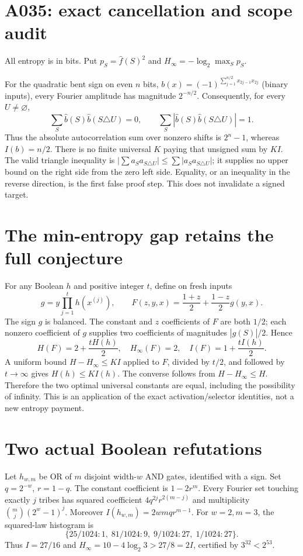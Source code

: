 \documentclass{article}
\begin{document}
\section*{A035: exact cancellation and scope audit}
All entropy is in bits. Put $p_S=\widehat f(S)^2$ and
$H_\infty=-\log_2\max_Sp_S$.

For the quadratic bent sign on even $n$ bits,
$b(x)=(-1)^{\sum_{j=1}^{n/2}x_{2j-1}x_{2j}}$ (binary inputs),
every Fourier amplitude has magnitude $2^{-n/2}$.
Consequently, for every $U\ne\varnothing$,
\[
 \sum_S\widehat b(S)\widehat b(S\triangle U)=0,
 \qquad\sum_S|\widehat b(S)\widehat b(S\triangle U)|=1.
\]
Thus the absolute autocorrelation sum over nonzero shifts is
$2^n-1$, whereas $I(b)=n/2$. There is no finite universal $K$
paying that unsigned sum by $K I$. The valid triangle inequality
is $|\sum a_Sa_{S\triangle U}|\le\sum|a_Sa_{S\triangle U}|$;
it supplies no upper bound on the right side from the zero left
side. Equality, or an inequality in the reverse direction, is the
first false proof step. This does not invalidate a signed target.

\section*{The min-entropy gap retains the full conjecture}
For any Boolean $h$ and positive integer $t$, define on fresh inputs
\[
 g=y\prod_{j=1}^t h(x^{(j)}),\qquad
 F(z,y,x)=\frac{1+z}{2}+\frac{1-z}{2}g(y,x).
\]
The sign $g$ is balanced. The constant and $z$ coefficients of $F$
are both $1/2$; each nonzero coefficient of $g$ supplies two
coefficients of magnitudes $|\widehat g(S)|/2$. Hence
\[
 H(F)=2+\frac{tH(h)}2,\quad H_\infty(F)=2,\quad
 I(F)=1+\frac{tI(h)}2.
\]
A uniform bound $H-H_\infty\le K I$ applied to $F$, divided by
$t/2$, and followed by $t\to\infty$ gives $H(h)\le K I(h)$.
The converse follows from $H-H_\infty\le H$.
Therefore the two optimal universal constants are equal, including
the possibility of infinity. This is an application of the exact
activation/selector identities, not a new entropy payment.

\section*{Two actual Boolean refutations}
Let $h_{w,m}$ be OR of $m$ disjoint width-$w$ AND gates, identified
with a sign. Set $q=2^{-w}$, $r=1-q$. The constant coefficient is
$1-2r^m$. Every Fourier set touching exactly $j$ tribes has squared
coefficient $4q^{2j}r^{2(m-j)}$ and multiplicity
$\binom mj(2^w-1)^j$. Moreover $I(h_{w,m})=2wmq r^{m-1}$.
For $w=2,m=3$, the squared-law histogram is
\[
 \{25/1024:1,\;81/1024:9,\;9/1024:27,\;1/1024:27\}.
\]
Thus $I=27/16$ and $H_\infty=10-4\log_2 3>27/8=2I$,
certified by $3^{32}<2^{53}$.
\end{document}
